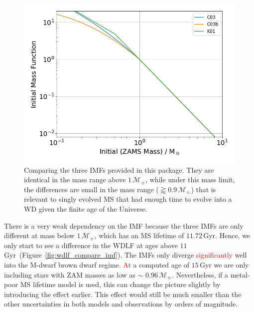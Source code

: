 \documentclass[fleqn,usenatbib]{rasti}
\newcommand{\msun}{\mathcal{M}_{\sun}}
\begin{document}
\begin{figure}
    \centering
    \includegraphics[width=\columnwidth]{fig_04_imfs.png}
    \caption{Comparing the three IMFs provided in this package. They are
    identical in the mass range above $1\,\msun$, while under this mass
    limit, the differences are small in the mass range ($\gtrapprox0.9\,\msun$)
    that is relevant to singly evolved MS that had enough time to evolve into a
    WD given the finite age of the Universe.}
    \label{fig:imfs}
\end{figure}

There is a very weak dependency on the IMF because the three IMFs are only
different at mass below $1\,\msun$, which has an MS lifetime of $11.72$\,Gyr.
Hence, we only start to see a difference in the WDLF at ages above
$11$\,Gyr~(Figure~\ref{fig:wdlf_compare_imf}). The IMFs only diverge \textcolor{red}{significantly}
well into the M-dwarf brown dwarf regime\textcolor{red}{. At} a computed age of $15$\,Gyr
we are only including stars with ZAM masses as low as $\sim$ $0.96\,\msun$.
Nevertheless, if a metal-poor MS lifetime model is used, this can change the
picture slightly by introducing the effect earlier. This effect would still
be much smaller than the other uncertainties in both models and observations
by orders of magnitude.
\end{document}
